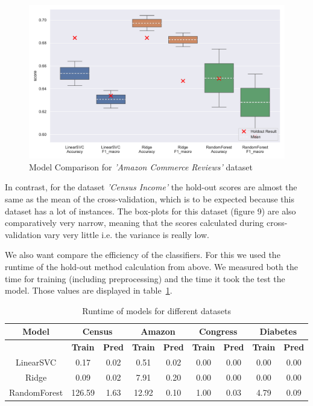 \documentclass[a4paper,12pt]{article}
\begin{document}
\begin{figure}[h!]
\centering
\includegraphics[width=\textwidth]{amazon/plots/model_comparison.pdf}
\caption{Model Comparison for \textit{'Amazon Commerce Reviews'} dataset}
\label{fig:model_comparison amazon}
\end{figure}





In contrast, for the dataset 
\textit{'Census Income'} the hold-out scores are almost the same as the mean of the cross-validation, which is to be
expected because this dataset has a lot of instances. The box-plots for this dataset (figure 9) are also
comparatively very narrow, meaning that the scores calculated during cross-validation vary very little i.e.
the variance is really low.




We also want compare the efficiency of the classifiers. For this we used the runtime of the hold-out
method calculation from above. We measured both the time for training (including preprocessing) and
the time it took the test the model. Those values are displayed in table~\ref{tab:runtime_models}.


\begin{table}[h!]
\centering
\footnotesize
\begin{tabular}{|c|c|c|c|c|c|c|c|c|}
\hline
\textbf{Model} & \multicolumn{2}{c|}{Census} & \multicolumn{2}{c|}{Amazon} & \multicolumn{2}{c|}{Congress} & \multicolumn{2}{c|}{Diabetes} \\
\hline
& \textbf{Train} & \textbf{Pred} & \textbf{Train} & \textbf{Pred} & \textbf{Train} & \textbf{Pred} & \textbf{Train} & \textbf{Pred} \\
\hline
LinearSVC & 0.17 & 0.02 & 0.51 & 0.02 & 0.00 & 0.00 & 0.00 & 0.00 \\
\hline
Ridge & 0.09 & 0.02 & 7.91 & 0.20 & 0.00 & 0.00 & 0.00 & 0.00 \\
\hline
RandomForest & 126.59 & 1.63 & 12.92 & 0.10 & 1.00 & 0.03 & 4.79 & 0.09 \\
\hline
\end{tabular}
\vspace{0.3cm}
\caption{Runtime of models for different datasets}
\label{tab:runtime_models}
\end{table}
\end{document}
